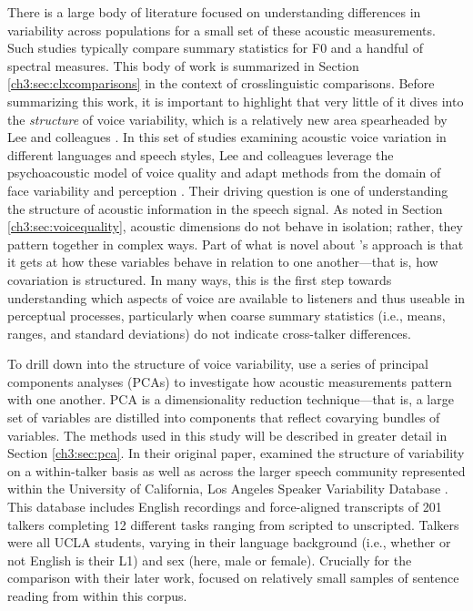 There is a large body of literature focused on understanding differences in variability across populations for a small set of these acoustic measurements. Such studies typically compare summary statistics for F0 and a handful of spectral measures. This body of work is summarized in Section \ref{ch3:sec:clxcomparisons} in the context of crosslinguistic comparisons. Before summarizing this work, it is important to highlight that very little of it dives into the \textit{structure} of voice variability, which is a relatively new area spearheaded by Lee and colleagues \citep{lee_2019_acoustic, lee_2019_spontaneous, lee_2020_language}. In this set of studies examining acoustic voice variation in different languages and speech styles, Lee and colleagues leverage the psychoacoustic model of voice quality \citep{kreiman_2014_theory} and adapt methods from the domain of face variability and perception \citep{burton_2016_faces}. Their driving question is one of understanding the structure of acoustic information in the speech signal. As noted in Section \ref{ch3:sec:voicequality}, acoustic dimensions do not behave in isolation; rather, they pattern together in complex ways. Part of what is novel about \citeauthor{lee_2019_acoustic}'s approach is that it gets at how these variables behave in relation to one another---that is, how covariation is structured. In many ways, this is the first step towards understanding which aspects of voice are available to listeners and thus useable in perceptual processes, particularly when coarse summary statistics (i.e., means, ranges, and standard deviations) do not indicate cross-talker differences. 

To drill down into the structure of voice variability, \citet{lee_2019_acoustic} use a series of principal components analyses (PCAs) to investigate how acoustic measurements pattern with one another. PCA is a dimensionality reduction technique---that is, a large set of variables are distilled into components that reflect covarying bundles of variables. The methods used in this study will be described in greater detail in Section \ref{ch3:sec:pca}. In their original paper, \citet{lee_2019_acoustic} examined the structure of variability on a within-talker basis as well as across the larger speech community represented within the University of California, Los Angeles Speaker Variability Database \citep{keating_2019_database}. This database includes English recordings and force-aligned transcripts of 201 talkers completing 12 different tasks ranging from scripted to unscripted. Talkers were all UCLA students, varying in their language background (i.e., whether or not English is their L1) and sex (here, male or female). Crucially for the comparison with their later work, \citet{lee_2019_acoustic} focused on relatively small samples of sentence reading from within this corpus. 

